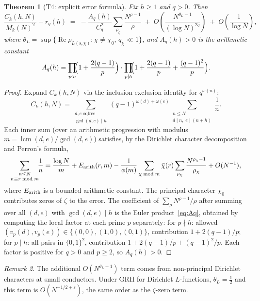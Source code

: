 \documentclass[11pt]{amsart}
\newtheorem{theorem}{Theorem}[section]
\theoremstyle{definition}
\theoremstyle{remark}
\newtheorem{remark}[theorem]{Remark}
\renewcommand{\Re}{\operatorname{Re}}
\newcommand{\half}{\tfrac12}
\newcommand{\om}{\omega}
\begin{document}
\begin{theorem}[T4: explicit error formula]\label{thm:error}
  Fix $h\ge 1$ and $q>0$.  Then
  \[
    \frac{C_k(h,N)}{M_k(N)^2} - r_q(h)
    \;=\; -\frac{A_q(h)}{C_q^2}
            \sum_{\rho_\zeta}\frac{N^{\rho-1}}{\rho}
    \;+\; O\!\left(\frac{N^{\theta_L-1}}{(\log N)^{2q}}\right)
    \;+\; O\!\left(\frac{1}{\log N}\right),
  \]
  where $\theta_L = \sup\{\Re\rho_{L(s,\chi)}: \chi\ne\chi_0,\,q_\chi\ll 1\}$,
  and $A_q(h)>0$ is the arithmetic constant
  \begin{equation}\label{eq:Aq}
    A_q(h) = \prod_{p\nmid h}\!\!\Bigl(1+\frac{2(q-1)}{p}\Bigr)
              \cdot\prod_{p\mid h}\!\!\Bigl(1+\frac{2(q-1)}{p}+\frac{(q-1)^2}{p}\Bigr).
  \end{equation}
\end{theorem}
\begin{proof}
  Expand $C_k(h,N)$ via the inclusion-exclusion identity for $q^{\om(n)}$:
  \[
    C_k(h,N) = \sum_{\substack{d,e\text{ sqfree}\\\gcd(d,e)\mid h}}
               (q-1)^{\om(d)+\om(e)}
               \!\!\!\sum_{\substack{n\le N\\d\mid n,\;e\mid(n+h)}}\!\!\!\frac{1}{n}.
  \]
  Each inner sum (over an arithmetic progression with modulus $m=\operatorname{lcm}(d,e)/\gcd(d,e)$)
  satisfies, by the Dirichlet character decomposition and Perron's formula,
  \[
    \sum_{\substack{n\le N\\n\equiv r\bmod m}}\!\!\frac{1}{n}
    = \frac{\log N}{m} + E_{\rm arith}(r,m)
      - \frac{1}{\phi(m)}\sum_{\chi\bmod m}\bar\chi(r)
        \sum_{\rho_\chi}\frac{N^{\rho_\chi-1}}{\rho_\chi}
      + O(N^{-1}),
  \]
  where $E_{\rm arith}$ is a bounded arithmetic constant.
  The principal character $\chi_0$ contributes zeros of $\zeta$ to the error.
  The coefficient of $\sum_\rho N^{\rho-1}/\rho$ after summing over all $(d,e)$
  with $\gcd(d,e)\mid h$ is the Euler product~\eqref{eq:Aq}, obtained by computing
  the local factor at each prime $p$ separately:
  for $p\nmid h$: allowed $(v_p(d),v_p(e))\in\{(0,0),(1,0),(0,1)\}$,
  contribution $1+2(q-1)/p$;
  for $p\mid h$: all pairs in $\{0,1\}^2$,
  contribution $1+2(q-1)/p+(q-1)^2/p$.
  Each factor is positive for $q>0$ and $p\ge 2$, so $A_q(h)>0$.
\end{proof}

\begin{remark}
  The additional $O(N^{\theta_L-1})$ term comes from non-principal Dirichlet characters
  at small conductors.  Under GRH for Dirichlet $L$-functions, $\theta_L=\half$ and
  this term is $O(N^{-1/2+\varepsilon})$, the same order as the $\zeta$-zero term.
\end{remark}
\end{document}
